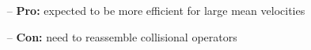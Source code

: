 \documentclass[landscape,archE,fontscale=0.285]{baposter} %
\begin{document}
\begin{poster}
{\begin{itemize}[leftmargin=*]
\item[--] \textbf{Pro:} expected to be more efficient for large mean velocities
\item[--] \textbf{Con:} need to reassemble collisional operators
\end{itemize}

}


\end{poster}
\end{document}
